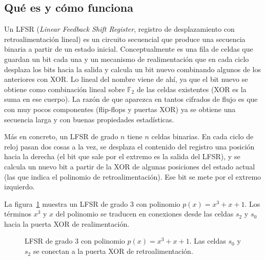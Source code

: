 \subsection{Qué es y cómo funciona}

Un LFSR (\textit{Linear Feedback Shift Register}, registro de desplazamiento con retroalimentación lineal)
es un circuito secuencial que produce una secuencia binaria a partir de un estado inicial.
Conceptualmente es una fila de celdas que guardan un bit cada una y un mecanismo de realimentación
que en cada ciclo desplaza los bits hacia la salida y calcula un bit nuevo combinando algunos de los
anteriores con XOR. Lo lineal del nombre viene de ahí, ya que el bit nuevo se obtiene como combinación lineal
sobre $\mathbb{F}_2$ de las celdas existentes (XOR es la suma en ese cuerpo).
La razón de que aparezca en tantos cifrados de flujo es que con muy pocos componentes (flip-flops y puertas XOR)
ya se obtiene una secuencia larga y con buenas propiedades estadísticas.

Más en concreto, un LFSR de grado $n$ tiene $n$ celdas binarias. En cada ciclo de reloj pasan dos cosas a la vez,
se desplaza el contenido del registro una posición hacia la derecha (el bit que sale por el extremo es la salida del LFSR),
y se calcula un nuevo bit a partir de la XOR de algunas posiciones del estado actual (las que indica el polinomio de retroalimentación).
Ese bit se mete por el extremo izquierdo.

La figura~\ref{fig:lfsr3} muestra un LFSR de grado 3 con polinomio $p(x) = x^3 + x + 1$.
Los términos $x^3$ y $x$ del polinomio se traducen en conexiones desde las celdas $s_2$ y $s_0$ hacia la puerta XOR de realimentación.

\begin{figure}[H]
\centering
{}
\caption{LFSR de grado 3 con polinomio $p(x) = x^3 + x + 1$.
Las celdas $s_0$ y $s_2$ se conectan a la puerta XOR de retroalimentación.}
\label{fig:lfsr3}
\end{figure}

